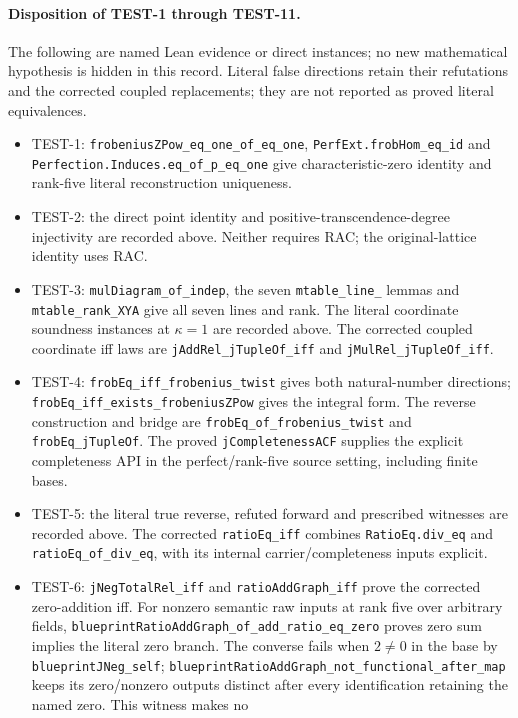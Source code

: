 \documentclass[11pt,oneside]{article}
\theoremstyle{definition}
\theoremstyle{remark}
\newcommand{\lean}[1]{\nolinkurl{#1}}
\begin{document}
\paragraph{Disposition of TEST-1 through TEST-11.}
The following are named Lean evidence or direct instances; no new mathematical hypothesis
is hidden in this record. Literal false directions retain their refutations and the
corrected coupled replacements; they are not reported as proved literal equivalences.
\begin{itemize}
\item TEST-1: \lean{frobeniusZPow_eq_one_of_eq_one}, \lean{PerfExt.frobHom_eq_id} and
\lean{Perfection.Induces.eq_of_p_eq_one} give characteristic-zero identity and rank-five
literal reconstruction uniqueness.
\item TEST-2: the direct point identity and positive-transcendence-degree injectivity are
recorded above. Neither requires RAC; the original-lattice identity uses RAC.
\item TEST-3: \lean{mulDiagram_of_indep}, the seven \texttt{mtable\_line\_} lemmas and
\lean{mtable_rank_XYA} give all seven lines and rank. The literal coordinate soundness
instances at $\kappa=1$ are recorded above. The corrected coupled coordinate iff laws
are \lean{jAddRel_jTupleOf_iff} and \lean{jMulRel_jTupleOf_iff}.
\item TEST-4: \lean{frobEq_iff_frobenius_twist} gives both natural-number directions;
\lean{frobEq_iff_exists_frobeniusZPow} gives the integral form. The reverse construction
and bridge are \lean{frobEq_of_frobenius_twist} and \lean{frobEq_jTupleOf}.
The proved \lean{jCompletenessACF} supplies the explicit completeness API in the
perfect/rank-five source setting, including finite bases.
\item TEST-5: the literal true reverse, refuted forward and prescribed witnesses are
recorded above. The corrected \lean{ratioEq_iff} combines \lean{RatioEq.div_eq} and
\lean{ratioEq_of_div_eq}, with its internal carrier/completeness inputs explicit.
\item TEST-6: \lean{jNegTotalRel_iff} and \lean{ratioAddGraph_iff} prove the corrected
zero-addition iff. For nonzero semantic raw inputs at rank five over arbitrary fields,
\lean{blueprintRatioAddGraph_of_add_ratio_eq_zero} proves zero sum implies the literal
zero branch. The converse fails when $2\ne0$ in the base by \lean{blueprintJNeg_self};
\lean{blueprintRatioAddGraph_not_functional_after_map} keeps its zero/nonzero outputs
distinct after every identification retaining the named zero. This witness makes no

\end{itemize}
\end{document}
